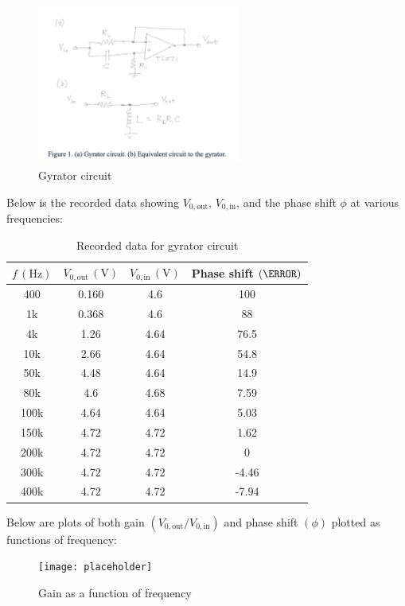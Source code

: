 \documentclass{article}
\begin{document}
\begin{figure}[H]
    \centering
    \includegraphics[width=0.6\textwidth]{img/Lab 9/1_1.png} %
    \caption{Gyrator circuit}
\end{figure}

Below is the recorded data showing \( V_{0,\text{out}} \), \( V_{0,\text{in}} \), 
and the phase shift \( \phi \) at various frequencies:

\begin{table}[H]
\centering
\begin{tabular}{|c|c|c|c|}
\hline
\( f \, (\text{Hz}) \) & \( V_{0,\text{out}} \, (\text{V}) \) & \( V_{0,\text{in}} \, (\text{V}) \) & Phase shift \( (\degree) \) \\
\hline
400   & 0.160 & 4.6  & 100 \\
1k    & 0.368 & 4.6  & 88  \\
4k    & 1.26  & 4.64 & 76.5 \\
10k   & 2.66  & 4.64 & 54.8 \\
50k   & 4.48  & 4.64 & 14.9 \\
80k   & 4.6   & 4.68 & 7.59 \\
100k  & 4.64  & 4.64 & 5.03 \\
150k  & 4.72  & 4.72 & 1.62 \\
200k  & 4.72  & 4.72 & 0 \\
300k  & 4.72  & 4.72 & -4.46 \\
400k  & 4.72  & 4.72 & -7.94 \\
\hline
\end{tabular}
\caption{Recorded data for gyrator circuit}
\end{table}

Below are plots of both gain \( (V_{0,\text{out}}/V_{0,\text{in}}) \) 
and phase shift \( (\phi) \) plotted as functions of frequency:

\begin{figure}[H]
    \centering
    \texttt{[image: placeholder]} %
    \caption{Gain as a function of frequency}
    \label{fig:gain}
\end{figure}
\end{document}
